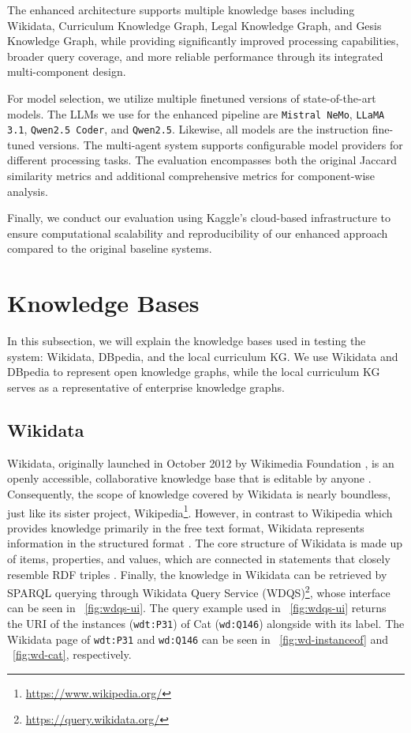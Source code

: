 The enhanced architecture supports multiple knowledge bases including Wikidata, Curriculum Knowledge Graph, Legal Knowledge Graph, and Gesis Knowledge Graph, while providing significantly improved processing capabilities, broader query coverage, and more reliable performance through its integrated multi-component design.

For model selection, we utilize multiple finetuned versions of state-of-the-art models. The LLMs we use for the enhanced pipeline are \texttt{Mistral NeMo}, \texttt{LLaMA 3.1}, \texttt{Qwen2.5 Coder}, and \texttt{Qwen2.5}. Likewise, all models are the instruction fine-tuned versions. The multi-agent system supports configurable model providers for different processing tasks. The evaluation encompasses both the original Jaccard similarity metrics and additional comprehensive metrics for component-wise analysis.

Finally, we conduct our evaluation using Kaggle's cloud-based infrastructure to ensure computational scalability and reproducibility of our enhanced approach compared to the original baseline systems.


\section{Knowledge Bases} \label{knowledgebase}
In this subsection, we will explain the knowledge bases used in testing the system: Wikidata, DBpedia, and the local curriculum KG. We use Wikidata and DBpedia to represent open knowledge graphs, while the local curriculum KG serves as a representative of enterprise knowledge graphs.

\subsection{Wikidata}
Wikidata, originally launched in October 2012 by Wikimedia Foundation \citep{vrandevcic2014}, is an openly accessible, collaborative knowledge base that is editable by anyone \citep{waagmeester2020}. Consequently, the scope of knowledge covered by Wikidata is nearly boundless, just like its sister project, Wikipedia\footnote{\url{https://www.wikipedia.org/}}. However, in contrast to Wikipedia which provides knowledge primarily in the free text format, Wikidata represents information in the structured format \citep{waagmeester2020}. The core structure of Wikidata is made up of items, properties, and values, which are connected in statements that closely resemble RDF triples \citep{Cantallops2019ASL}. Finally, the knowledge in Wikidata can be retrieved by SPARQL querying through Wikidata Query Service (WDQS)\footnote{\url{https://query.wikidata.org/}}, whose interface can be seen in \pic~\ref{fig:wdqs-ui}. The query example used in \pic~\ref{fig:wdqs-ui} returns the URI of the instances (\texttt{wdt:P31}) of Cat (\texttt{wd:Q146}) alongside with its label. The Wikidata page of \texttt{wdt:P31} and \texttt{wd:Q146} can be seen in \pic~\ref{fig:wd-instanceof} and \pic~\ref{fig:wd-cat}, respectively.

